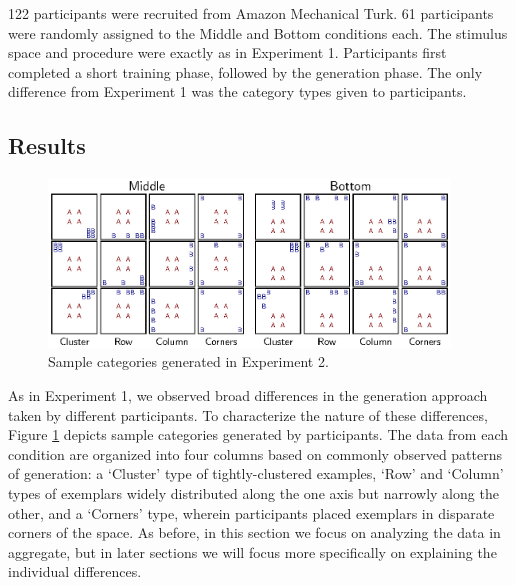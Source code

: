 \documentclass[pdflatex,sn-apa]{sn-jnl}%
\theoremstyle{thmstyleone}%
\theoremstyle{thmstyletwo}%
\theoremstyle{thmstylethree}%
\begin{document}
122 participants were recruited from Amazon Mechanical Turk. 61 participants
were randomly assigned to the Middle and Bottom conditions each. The stimulus
space and procedure were exactly as in Experiment 1. Participants first
completed a short training phase, followed by the generation phase. The only
difference from Experiment 1 was the category types given to participants.


\subsection{Results}

\begin{figure}
    \begin{center} \includegraphics[width=0.95\textwidth]{figs/e2-samples.eps}
    \caption{Sample categories generated in Experiment 2. }
    \label{fig:e2-samples}
    \end{center}
\end{figure}


As in Experiment 1, we observed broad differences in the generation approach
taken by different participants. To characterize the nature of these
differences, Figure \ref{fig:e2-samples} depicts sample categories generated by
participants. The data from each condition are organized into four columns based
on commonly observed patterns of generation: a `Cluster' type of
tightly-clustered examples, `Row' and `Column' types of exemplars widely
distributed along the one axis but narrowly along the other, and a `Corners'
type, wherein participants placed exemplars in disparate corners of the space.
As before, in this section we focus on analyzing the data in aggregate, but in
later sections we will focus more specifically on explaining the individual
differences.
\end{document}
